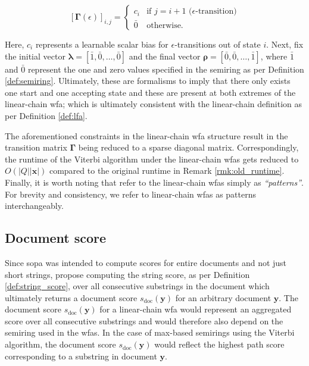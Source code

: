 \begin{equation}
  \label{eq:sopa_transition_matrix_epsilon}
  [\bm{\Gamma}(\epsilon)]_{i,j} =
  \begin{cases}
    c_i  & \text{if } j = i + 1 \text{ ($\epsilon$-transition)} \\
    \bar{0} & \text{otherwise.}
  \end{cases}
\end{equation}

Here, $c_i$ represents a learnable scalar bias for $\epsilon$-transitions out of
state $i$. Next, \citet{schwartz2018sopa} fix the initial vector $\bm{\lambda} =
[\bar{1}, \bar{0}, \ldots, \bar{0}]$ and the final vector $\bm{\rho} = [\bar{0},
\bar{0}, \ldots, \bar{1}]$, where $\bar{1}$ and $\bar{0}$ represent the one and
zero values specified in the semiring as per Definition \ref{def:semiring}.
Ultimately, these are formalisms to imply that there only exists one start and
one accepting state and these are present at both extremes of the linear-chain
\ac{wfa}; which is ultimately consistent with the linear-chain definition as per Definition
\ref{def:lfa}.

The aforementioned constraints in the linear-chain \ac{wfa} structure result in the
transition matrix $\bm{\Gamma}$ being reduced to a sparse diagonal matrix.
Correspondingly, the runtime of the Viterbi algorithm under the linear-chain
\ac{wfas} gets reduced to $O(|Q||\bm{x}|)$ compared to the original runtime in
Remark \ref{rmk:old_runtime}. Finally, it is worth noting that \citet[Page 3,
Section 3.1]{schwartz2018sopa} refer to the linear-chain \ac{wfas} simply as
\textit{``patterns''}. For brevity and consistency, we refer to linear-chain
\ac{wfas} as patterns interchangeably.

\subsection{Document score}

\label{section:sopa_doc_score}

Since \ac{sopa} was intended to compute scores for entire documents and not just
short strings, \citet[Page 3, Section 3.2]{schwartz2018sopa} propose computing
the string score, as per Definition \ref{def:string_score}, over all consecutive
substrings in the document which ultimately returns a document score
$s_{\text{doc}}(\bm{y})$ for an arbitrary document $\bm{y}$. The document score
$s_{\text{doc}}(\bm{y})$ for a linear-chain \ac{wfa} would represent an
aggregated score over all consecutive substrings and would therefore also depend
on the semiring used in the \ac{wfas}. In the case of max-based semirings using
the Viterbi algorithm, the document score $s_{\text{doc}}(\bm{y})$ would reflect
the highest path score corresponding to a substring in document $\bm{y}$.

